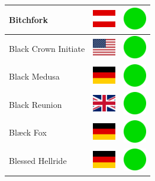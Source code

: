 \documentclass[12pt, a4paper, twoside]{report}
\begin{document}
\begin{center}
\begin{longtable}{|p{5cm}|p{2cm}|p{2cm}|}
			Bitchfork & \includegraphics[width=1cm]{4x3/at} & \includegraphics[width=1cm]{likes/y} \\ \hline
			Black Crown Initiate & \includegraphics[width=1cm]{4x3/us} & \includegraphics[width=1cm]{likes/y} \\ \hline
			Black Medusa & \includegraphics[width=1cm]{4x3/de} & \includegraphics[width=1cm]{likes/y} \\ \hline
			Black Reunion & \includegraphics[width=1cm]{4x3/gb} & \includegraphics[width=1cm]{likes/y} \\ \hline
			Blæck Fox & \includegraphics[width=1cm]{4x3/de} & \includegraphics[width=1cm]{likes/y} \\ \hline
			Blessed Hellride & \includegraphics[width=1cm]{4x3/de} & \includegraphics[width=1cm]{likes/y} \\ \hline

\end{longtable}
\end{center}
\end{document}
